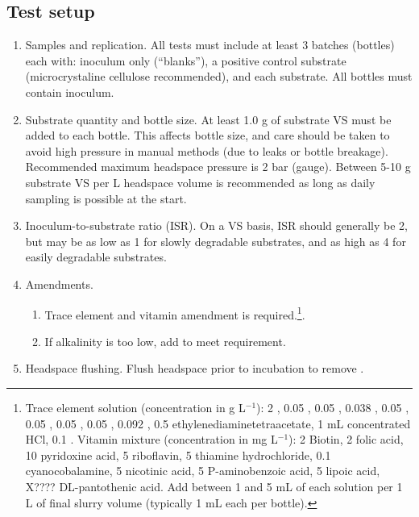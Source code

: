 \documentclass[]{article}
\begin{document}
\subsection{Test setup}
\begin{enumerate}
  \item Samples and replication. 
    All tests must include at least 3 batches (bottles) each with: inoculum only (``blanks''), a positive control substrate (microcrystaline cellulose recommended), and each substrate. 
    All bottles must contain inoculum.
  \item Substrate quantity and bottle size. At least 1.0 g of substrate VS must be added to each bottle. This affects bottle size, and care should be taken to avoid high pressure in manual methods (due to leaks or bottle breakage). Recommended maximum headspace pressure is 2 bar (gauge). Between 5-10 g substrate VS per L headspace volume is recommended as long as daily sampling is possible at the start. 
  \item Inoculum-to-substrate ratio (ISR). On a VS basis, ISR should generally be 2, but may be as low as 1 for slowly degradable substrates, and as high as 4 for easily degradable substrates.
  \item Amendments. 
    \begin{enumerate}
      \item Trace element and vitamin amendment is required.\footnote{
          Trace element solution (concentration in g L$^{-1}$): 2 , 0.05 , 0.05 , 0.038 , 0.05 , 
          0.05 , 0.05 , 0.05 , 0.092 , 0.5 ethylenediaminetetraacetate, 1 mL concentrated HCl, 
          0.1 .
          \newline
          Vitamin mixture (concentration in mg L$^{-1}$): 2 Biotin, 2 folic acid, 10 pyridoxine acid, 5 riboflavin, 5 thiamine hydrochloride, 0.1 cyanocobalamine, 
          5 nicotinic acid, 5 P-aminobenzoic acid, 5 lipoic acid, X???? DL-pantothenic acid.
          \newline
          Add between 1 and 5 mL of each solution per 1 L of final slurry volume (typically 1 mL each per bottle).
        }.
      \item If alkalinity is too low, add  to meet requirement.
    \end{enumerate}
  \item Headspace flushing. Flush headspace prior to incubation to remove . 

\end{enumerate}
\end{document}
